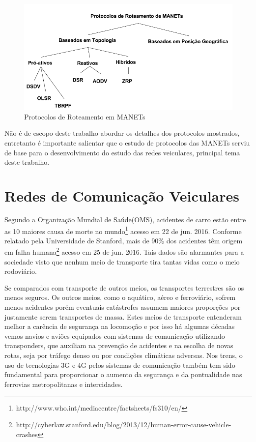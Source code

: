 \documentclass[
12pt,				%
openright,			%
oneside,			%
a4paper,			%
brazil,				%
]{abntex2}
\begin{document}
	\begin{figure} [H]
		\centering
		\includegraphics[scale=.5]{figuras/cap2/12ProtocolosDeRoteamentoMANETs}
		\caption{\label{fig_12}Protocolos de Roteamento em MANETs}
	\end{figure}	
	
	\par Não é de escopo deste trabalho abordar os detalhes dos protocolos mostrados, entretanto é importante salientar que o estudo de protocolos das MANETs serviu de base para o desenvolvimento do estudo das redes veiculares, principal tema deste trabalho. 
	

	
	\newpage
	\chapter{Redes de Comunicação Veiculares}
	
	\par Segundo a Organização Mundial de Saúde(OMS), acidentes de carro estão entre as 10 maiores causa de morte no mundo{\footnote{http://www.who.int/mediacentre/factsheets/fs310/en/} acesso em 22 de jun. 2016}. Conforme relatado pela Universidade de Stanford, mais de 90\% dos acidentes têm origem em falha humana{\footnote{http://cyberlaw.stanford.edu/blog/2013/12/human-error-cause-vehicle-crashes} acesso em 25 de jun. 2016}. Tais dados são alarmantes para a sociedade visto que nenhum meio de transporte tira tantas vidas como o meio rodoviário.
	
	\par Se comparados com transporte de outros meios, os transportes terrestres são os menos seguros. Os outros meios, como o aquático, aéreo e ferroviário, sofrem menos acidentes porém eventuais catástrofes assumem maiores proporções por justamente serem transportes de massa. Estes meios de transporte entenderam melhor a carência de segurança na locomoção e por isso há algumas décadas vemos navios e aviões equipados com sistemas de comunicação utilizando transponders, que auxiliam na prevenção de acidentes e na escolha de novas rotas, seja por tráfego denso ou por condições climáticas adversas. Nos trens, o uso de tecnologias 3G e 4G pelos sistemas de comunicação também tem sido fundamental para proporcionar o aumento da segurança e da pontualidade nas ferrovias metropolitanas e intercidades.
	
\end{document}
